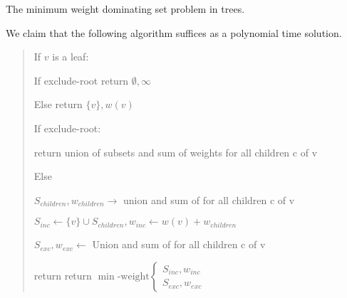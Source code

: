 \documentclass{article}
\begin{document}
\begin{subexercise}
  The minimum weight dominating set problem in trees.
\end{subexercise}

\begin{solution} We claim that the following algorithm suffices as a polynomial time solution.

\begin{quote}%

\begin{steps}
    \item If \( v \) is a leaf:
    \begin{steps}
        \item If exclude-root return \( \emptyset, \infty \)
        \item Else return \( \{v\}, w(v) \)
    \end{steps}

    \item If exclude-root:
    \begin{steps}
         \item return union of subsets and sum of weights  for all children c of v
     \end{steps}
    \item Else
    \begin{steps}
        \item \( S_{children}, w_{children} \rightarrow \) union and sum of  for all children c of v
        \item \( S_{inc}\leftarrow \{v\} \cup S_{children} ,w_{inc} \leftarrow w(v) + w_{children} \)
        \item \( S_{exc}, w_{exc} \leftarrow \) Union and sum of  for all children c of v
        \item return return $ \min\text{-weight} \begin{cases}
           S_{inc},w_{inc}\\
           S_{exc}, w_{exc}
        \end{cases}$
    \end{steps}


\end{steps}
\end{quote}
\end{solution}
\end{document}
